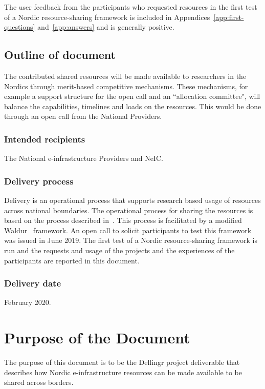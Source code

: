 \documentclass{article}
\newcommand{\dell}{Dellingr\xspace}
\newcommand{\einfra}{e-infrastructure\xspace}
\newcommand{\pilot}{first test of a Nordic resource-sharing framework\xspace}
\begin{document}
The user feedback from the participants who requested resources in the \pilot is included in Appendices~\ref{app:first-questions} and~\ref{app:answers} and is generally positive.

\subsection{Outline of document}

The contributed shared resources will be made available to researchers in the Nordics through merit-based competitive mechanisms. These mechanisms, for example a support structure for the open call and an ``allocation committee", will balance the capabilities, timelines and loads on the resources. This would be done through an open call from the National Providers.

\subsubsection{Intended recipients}

The National \einfra Providers and NeIC. 

\subsubsection{Delivery process}

Delivery is an operational process that supports research based usage of resources across national boundaries. 
The operational process for sharing the resources is based on the process described in~\cite{dellingr-p2-do5}.
This process is facilitated by a modified Waldur~\cite{waldur} framework.
An open call to solicit participants to test this framework was issued in June 2019.
The \pilot is run and the requests and usage of the projects and the experiences of the participants are reported in this document.
\subsubsection{Delivery date}

February 2020.

\section{Purpose of the Document}

The purpose of this document is to be the \dell project deliverable that describes how Nordic \einfra resources
can be made available to be shared across borders.
\end{document}
